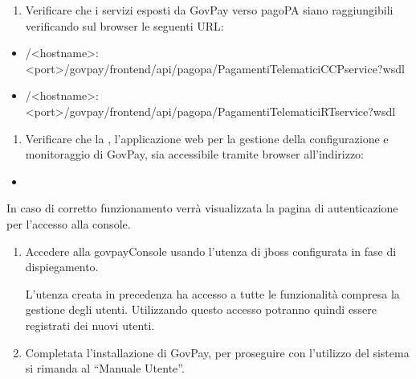 \documentclass[letterpaper,10pt,italian]{sphinxmanual}
\begin{document}
\begin{enumerate}
\item {} 
Verificare che i servizi esposti da GovPay verso pagoPA siano
raggiungibili verificando sul browser le seguenti URL:

\end{enumerate}
\begin{itemize}
\item {} 
/\textless{}hostname\textgreater{}:\textless{}port\textgreater{}/govpay/frontend/api/pagopa/PagamentiTelematiciCCPservice?wsdl

\item {} 
/\textless{}hostname\textgreater{}:\textless{}port\textgreater{}/govpay/frontend/api/pagopa/PagamentiTelematiciRTservice?wsdl

\end{itemize}
\begin{enumerate}
\item {} 
Verificare che la , l’applicazione web per la
gestione della configurazione e monitoraggio di GovPay, sia
accessibile tramite browser all’indirizzo:

\end{enumerate}
\begin{itemize}
\item {} 

\end{itemize}

In caso di corretto funzionamento verrà visualizzata la pagina di
autenticazione per l’accesso alla console.
\begin{enumerate}
\item {} 
Accedere alla govpayConsole usando l’utenza di jboss configurata in
fase di dispiegamento.

L’utenza creata in precedenza ha accesso a tutte le funzionalità
compresa la gestione degli utenti. Utilizzando questo accesso
potranno quindi essere registrati dei nuovi utenti.

\item {} 
Completata l’installazione di GovPay, per proseguire con l’utilizzo
del sistema si rimanda al “Manuale Utente”.

\end{enumerate}
\end{document}
